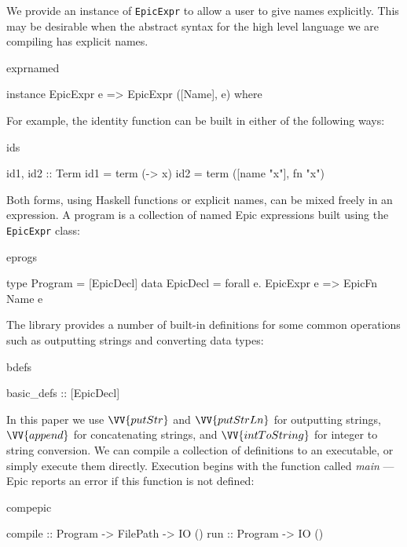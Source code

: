 \noindent
We provide an instance of \texttt{EpicExpr} to allow a user to give
names explicitly. This may be desirable when the abstract syntax for the 
high level language we are compiling has explicit names.

\begin{SaveVerbatim}{exprnamed}

instance EpicExpr e => EpicExpr ([Name], e) where

\end{SaveVerbatim}

\noindent
For example, the identity function can be built in either of the following ways:

\begin{SaveVerbatim}{ids}

id1, id2 :: Term
id1 = term (\x -> x)
id2 = term ([name "x"], fn "x")

\end{SaveVerbatim}

\noindent
Both forms, using Haskell functions or explicit names, can be mixed
freely in an expression. A program is a collection of named Epic
expressions built using the \texttt{EpicExpr} class:

\begin{SaveVerbatim}{eprogs}

type Program = [EpicDecl]
data EpicDecl = forall e. EpicExpr e => EpicFn Name e

\end{SaveVerbatim}

\noindent
The library provides a number of built-in definitions for some common
operations such as outputting strings and converting data types:

\begin{SaveVerbatim}{bdefs}

basic_defs :: [EpicDecl]

\end{SaveVerbatim}

\noindent
In this paper we use $\VV{putStr}$ and $\VV{putStrLn}$ for outputting
strings, $\VV{append}$ for concatenating strings, and
$\VV{intToString}$ for integer to string conversion.
We can compile a collection of definitions to an executable, or simply
execute them directly. Execution begins with the function called
\textit{main} --- Epic reports an error if this function is not
defined:

\begin{SaveVerbatim}{compepic}

compile :: Program -> FilePath -> IO ()
run     :: Program -> IO ()
\end{SaveVerbatim}

